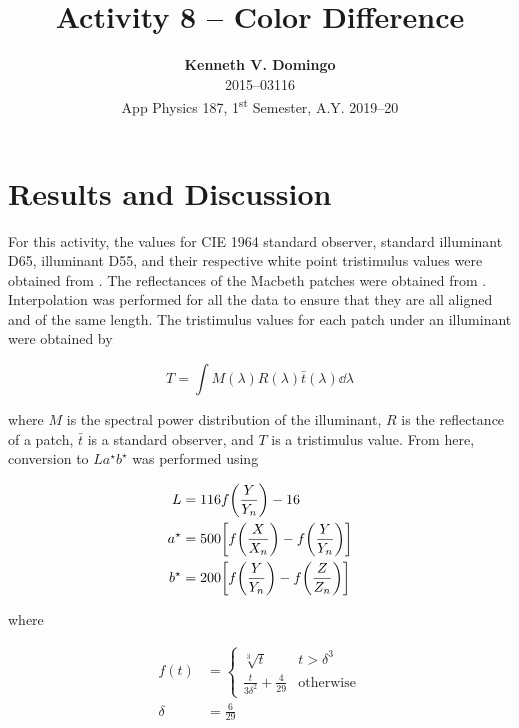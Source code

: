 \documentclass[12pt,a4paper]{article}
\newcommand{\activity}{Activity 8 -- Color Difference}
\begin{document}
\title{\TitleFont \activity}
\author[ ]{\textbf{Kenneth V. Domingo} \\
2015--03116 \\
App Physics 187, 1\textsuperscript{st} Semester, A.Y. 2019--20}

\maketitle
\thispagestyle{titlestyle}

\section*{Results and Discussion}
\setcounter{section}{1}

For this activity, the values for CIE 1964 standard observer, standard illuminant D65, illuminant D55, and their respective white point tristimulus values were obtained from \cite{cie64}. The reflectances of the Macbeth patches were obtained from \citep{soriano}. Interpolation was performed for all the data to ensure that they are all aligned and of the same length. The tristimulus values for each patch under an illuminant were obtained by

\begin{equation}\label{eq:tristimulus}
	T = \int M(\lambda) R(\lambda) \bar{t}(\lambda) \dd{\lambda}
\end{equation}

\noindent where $M$ is the spectral power distribution of the illuminant, $R$ is the reflectance of a patch, $\bar{t}$ is a standard observer, and $T$ is a tristimulus value. From here, conversion to $La^\star b^\star$ was performed using

\begin{equation}\label{eq:XYZ2Lab}
\begin{aligned} 
	L &= 116 f\qty(\frac{Y}{Y_n}) - 16 \\
	a^\star &= 500\qty[f\qty(\frac{X}{X_n}) - f\qty(\frac{Y}{Y_n})]  \\
	b^\star &= 200\qty[f\qty(\frac{Y}{Y_n}) - f\qty(\frac{Z}{Z_n})]
\end{aligned}
\end{equation}

\noindent where

\begin{align*}
	f(t) &=
	\begin{cases}
		\sqrt[3]{t} & t > \delta^3 \\
		\frac{t}{3\delta^2} + \frac{4}{29} & \textrm{otherwise}
	\end{cases} \\
	\delta &= \frac{6}{29}
\end{align*}
\end{document}
